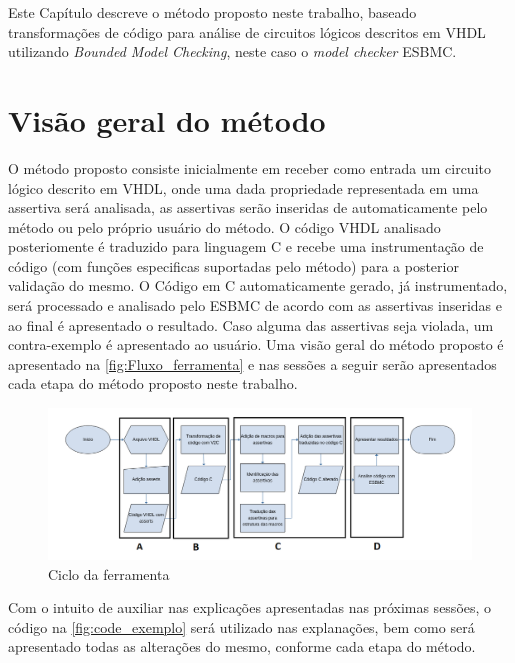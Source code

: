 \label{chapter:metodo}
Este Capítulo descreve o método proposto neste trabalho, baseado transformações de código para análise de circuitos lógicos descritos em VHDL utilizando 
\textit{Bounded Model Checking}, neste caso o \textit{model checker} ESBMC.

\section{Visão geral do método}

O método proposto 
consiste inicialmente em receber como entrada um circuito lógico descrito em VHDL, onde uma dada propriedade representada em uma assertiva será analisada, as assertivas serão inseridas de automaticamente pelo método ou pelo próprio usuário do método. O código VHDL analisado posteriomente é traduzido para linguagem C e recebe uma instrumentação de código (com funções especificas suportadas pelo método) para a posterior validação do mesmo. O Código em C automaticamente gerado, já instrumentado, será processado e analisado pelo ESBMC de acordo com as assertivas inseridas e ao final é apresentado o resultado. Caso alguma das assertivas seja violada, um contra-exemplo é apresentado ao usuário. Uma visão geral do método proposto é apresentado na \autoref{fig:Fluxo_ferramenta} e nas sessões a seguir serão apresentados cada etapa do método proposto neste trabalho.

\begin{figure}[H]
	\begin{center}
    \caption{\label{fig:Fluxo_ferramenta}Ciclo da ferramenta}
	\includegraphics[scale=0.55]{Figuras/Fluxo_ferramenta.png}
	\end{center}
\end{figure}


Com o intuito de auxiliar nas explicações apresentadas nas próximas sessões, o código na \autoref{fig:code_exemplo} será utilizado nas explanações, bem como será apresentado todas as alterações do mesmo, conforme cada etapa do método.  

